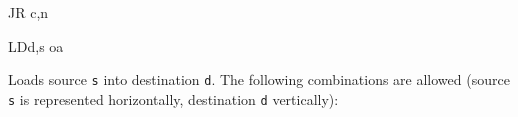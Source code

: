 \begin{basedescript}{
	\desclabelstyle{\multilinelabel}
	\desclabelwidth{3cm}}
\begin{DetailItem}{JR c,n}{}
		\begin{DetailTiming}
		\end{DetailTiming}

	\end{DetailItem}

	\pagebreak


	\begin{DetailItem}{LD}{d,s}
		{oa}
		{}

		Loads source {\tt s} into destination {\tt d}. The following combinations are allowed (source {\tt s} is represented horizontally, destination {\tt d} vertically):

		{
			\fontsize{10pt}{10pt}	%
			\setlength{\tabcolsep}{1pt}

			\newcommand{\OO}{$\bullet$}
			\newcommand{\OQ}{\cellcolor{PrintableLightMidGray}$\bullet$}
			\newcommand{\ii}{\cellcolor{PrintableLightGray}}
			\newcommand{\ik}{\cellcolor{PrintableMidGray}}
			\newcommand{\Small}[1]{\FontSize{8.5pt}{#1}}
			\newcommand{\Mini}[1]{\FontSize{7.5pt}{#1}}


}
\end{DetailItem}
\end{basedescript}
